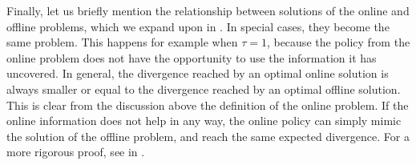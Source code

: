 Finally, let us briefly mention the relationship between solutions of the online and offline problems, which we expand upon in .
In special cases, they become the same problem.
This happens for example when $ \tau = 1 $, because the policy from the online problem does not have the opportunity to use the information it has uncovered.
In general, the divergence reached by an optimal online solution is always smaller or equal to the divergence reached by an optimal offline solution.
This is clear from the discussion above the definition of the online problem.
If the online information does not help in any way, the online policy can simply mimic the solution of the offline problem, and reach the same expected divergence.
For a more rigorous proof, see  in .

